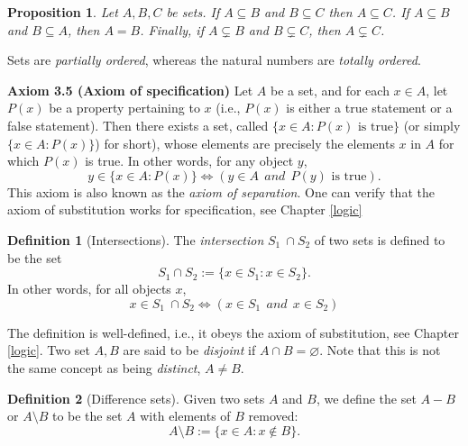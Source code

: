 \documentclass[
]{book}
\newtheorem{proposition}{Proposition}[chapter]
\theoremstyle{definition}
\newtheorem{definition}{Definition}[chapter]
\theoremstyle{definition}
\theoremstyle{definition}
\theoremstyle{definition}
\theoremstyle{remark}
\begin{document}
\begin{proposition}
Let \(A,B,C\) be sets. If \(A \subseteq B\) and \(B\subseteq C\) then \(A \subseteq C\). If \(A \subseteq B\) and \(B\subseteq A\), then \(A=B\). Finally, if \(A \subsetneq B\) and \(B\subsetneq C\), then \(A \subsetneq C\).
\end{proposition}

Sets are \emph{partially ordered}, whereas the natural numbers are \emph{totally ordered}.

\textbf{Axiom 3.5 (Axiom of specification)} Let \(A\) be a set, and for each \(x\in A\), let \(P(x)\) be a property pertaining to \(x\) (i.e., \(P(x)\) is either a true statement or a false statement). Then there exists a set, called \(\{x\in A: P(x) \text{ is true}\}\) (or simply \(\{x\in A: P(x)\}\)) for short), whose elements are precisely the elements \(x\) in \(A\) for which \(P(x)\) is true. In other words, for any object \(y\),
\[
y \in \{x\in A: P(x)\} \iff (y\in A\ \ and\ \ P(y) \text{ is true}).
\]
This axiom is also known as the \emph{axiom of separation}. One can verify that the axiom of substitution works for specification, see Chapter \ref{logic}

\begin{definition}[Intersections]
The \emph{intersection} \(S_1\ \cap S_2\) of two sets is defined to be the set
\[
S_1 \cap S_2 := \{x\in S_1 : x\in S_2 \}.
\]
In other words, for all objects \(x\),
\[
x\in S_1\ \cap S_2 \iff (x\in S_1\ \ and\ \ x\in S_2)
\]
\end{definition}

The definition is well-defined, i.e., it obeys the axiom of substitution, see Chapter \ref{logic}. Two set \(A,B\) are said to be \emph{disjoint} if \(A\cap B=\varnothing\). Note that this is not the same concept as being \emph{distinct}, \(A\ne B\).

\begin{definition}[Difference sets]
Given two sets \(A\) and \(B\), we define the set \(A-B\) or \(A \setminus B\) to be the set \(A\) with elements of \(B\) removed:
\[
A\setminus B:=\{x\in A: x\not \in B\}.
\]
\end{definition}
\end{document}
